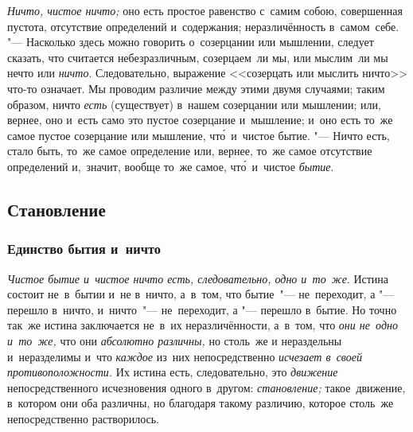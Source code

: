 {\em Ничто, чистое ничто;} оно есть простое равенство с~самим собою,
совершенная пустота, отсутствие определений и~содержания; неразличённость
в~самом~себе. "--- Насколько здесь можно говорить о~созерцании или мышлении,
следует сказать, что считается небезразличным, созерцаем~ли мы, или мыслим~ли
мы нечто или {\em ничто}. Следовательно, выражение <<созерцать или мыслить ничто>>
что-то означает. Мы проводим различие между этими двумя
случаями; таким образом, ничто {\em есть} (существует) в~нашем созерцании или
мышлении; или, вернее, оно и~есть само это пустое созерцание и~мышление; и~оно
есть то~же самое пустое созерцание или мышление, чт\'{о}~и~чистое бытие. "---
Ничто есть, стало быть, то~же самое определение или, вернее, то~же самое
отсутствие определений и,~значит, вообще то~же самое,
чт\'{о}~и~чистое {\em бытие}.

\subsection{Становление}

\subsubsection{Единство бытия и~ничто}

{\em Чистое бытие и~чистое ничто есть, следовательно, одно и~то~же}. Истина
состоит не~в~бытии и~не в~ничто, а~в~том, что бытие~"--- не~переходит, а "---
перешло в~ничто, и~ничто~"--- не~переходит, а "--- перешло в~бытие. Но точно
так~же истина заключается не~в~их неразличённости, а~в~том, что
{\em они не~одно и~то~же,} что они {\em абсолютно различны,} но столь~же и
нераздельны и~неразделимы и~что {\em каждое} из~них непосредственно
{\em исчезает в~своей противоположности.} Их истина есть, следовательно, это
{\em движение} непосредственного исчезновения одного в~другом:
{\em становление;} такое~движение, в~котором они оба различны,
но благодаря такому различию, которое столь~же непосредственно растворилось.


